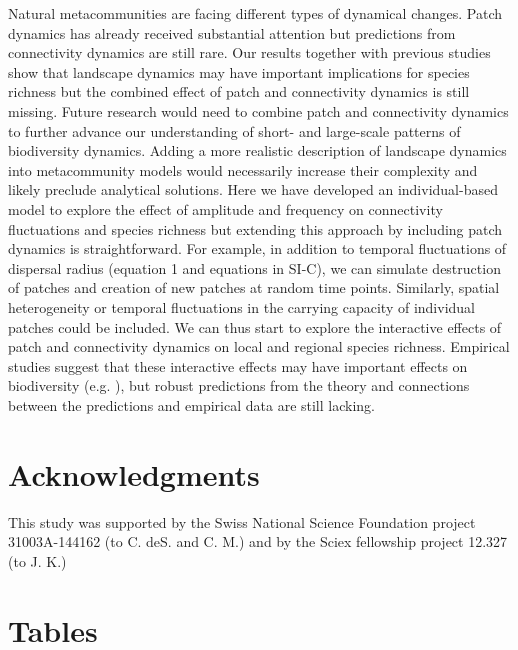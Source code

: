 \documentclass[12pt]{article}
\begin{document}
Natural metacommunities are facing different types of dynamical changes. Patch dynamics has already received substantial attention but predictions from connectivity dynamics are still rare. Our results together with previous studies show that landscape dynamics may have important implications for species richness but the combined effect of patch and connectivity dynamics is still missing. Future research would need to combine patch and connectivity dynamics to further advance our understanding of short- and large-scale patterns of biodiversity dynamics. Adding a more realistic description of landscape dynamics into metacommunity models would necessarily increase their complexity and likely preclude analytical solutions. Here we have developed an individual-based model to explore the effect of amplitude and frequency on connectivity fluctuations and species richness but extending this approach by including patch dynamics is straightforward. For example, in addition to temporal fluctuations of dispersal radius (equation 1 and equations in SI-C), we can simulate destruction of patches and creation of new patches at random time points. Similarly, spatial heterogeneity or temporal fluctuations in the carrying capacity of individual patches could be included. We can thus start to explore the interactive effects of patch and connectivity dynamics on local and regional species richness. Empirical studies suggest that these interactive effects may have important effects on biodiversity (e.g. \cite{LauranceEtAl1997, RoshierEtAl2008, MetzgerEtAl2009, RuizEtAl2014}), but robust predictions from the theory and connections between the predictions and empirical data are still lacking. 

\section*{Acknowledgments}

This study was supported by the Swiss National Science Foundation
project 31003A-144162 (to C. deS. and C. M.) and by the Sciex fellowship
project 12.327 (to J. K.)

\newpage



\section*{Tables}
\end{document}
